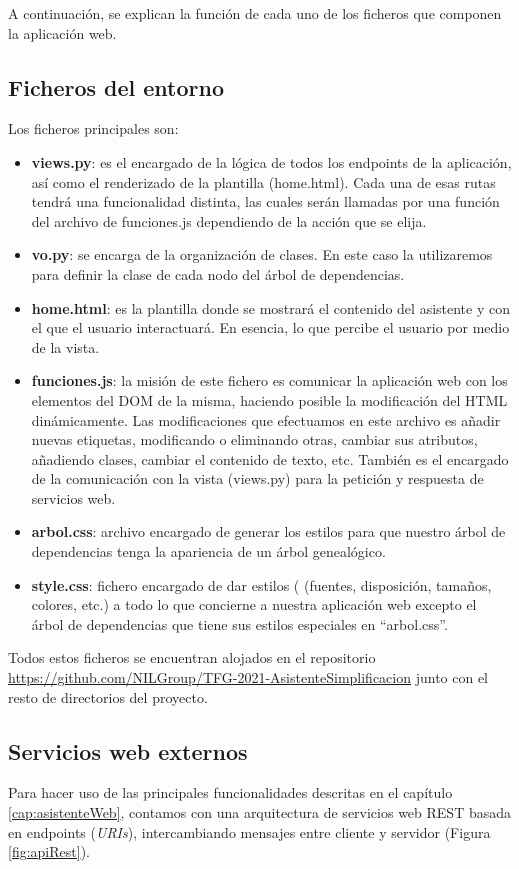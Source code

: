 A continuación, se explican la función de cada uno de los ficheros que componen la aplicación web.

\subsection{Ficheros del entorno}

Los ficheros principales son:
\begin{itemize}
	\item \textbf{views.py}: es el encargado de la lógica de todos los endpoints de la aplicación, así como el renderizado de la plantilla (home.html). Cada una de esas rutas tendrá una funcionalidad distinta, las cuales serán llamadas por una función del archivo de funciones.js dependiendo de la acción que se elija.
	\item \textbf{vo.py}: se encarga de la organización de clases. En este caso la utilizaremos para definir la clase de cada nodo del árbol de dependencias.
	\item \textbf{home.html}: es la plantilla donde se mostrará el contenido del asistente y con el que el usuario interactuará. En esencia, lo que percibe el usuario por medio de la vista.
	\item \textbf{funciones.js}: la misión de este fichero es comunicar la aplicación web con los elementos del DOM de la misma, haciendo posible la modificación del HTML dinámicamente. Las modificaciones que efectuamos en este archivo es añadir nuevas etiquetas, modificando o eliminando otras, cambiar sus atributos, añadiendo clases, cambiar el contenido de texto, etc. También es el encargado de la comunicación con la vista (views.py) para la petición y respuesta de servicios web.
	\item \textbf{arbol.css}: archivo encargado de generar los estilos para que nuestro árbol de dependencias tenga la apariencia de un árbol genealógico.
	\item \textbf{style.css}: fichero encargado de dar estilos ( (fuentes, disposición, tamaños, colores, etc.) a todo lo que concierne a nuestra aplicación web excepto el árbol de dependencias que tiene sus estilos especiales en ``arbol.css''. 
\end{itemize}

 Todos estos ficheros se encuentran alojados en el repositorio \url{https://github.com/NILGroup/TFG-2021-AsistenteSimplificacion} junto con el resto de directorios del proyecto.

\subsection{Servicios web externos}\label{sec:serviciosWebExternos}
Para hacer uso de las principales funcionalidades descritas en el capítulo \ref{cap:asistenteWeb}, contamos con una arquitectura de servicios web REST basada en endpoints (\textit{URIs}), intercambiando mensajes entre cliente y servidor (Figura \ref{fig:apiRest}). 

